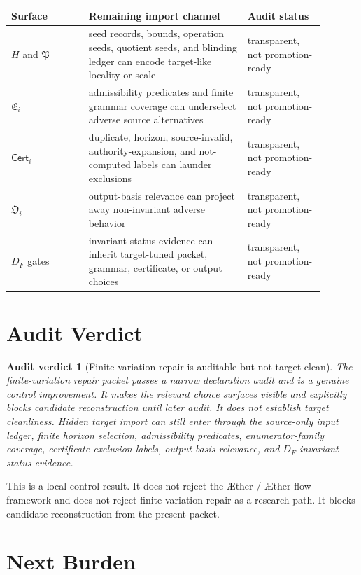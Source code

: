 \documentclass[11pt]{article}
\newcommand{\Aether}{\AE{}ther}
\newcommand{\Aflow}{\AE{}ther-flow}
\newcommand{\TheoryProgram}{\Aether{} / \Aflow{} framework}
\newcommand{\PackFam}{\mathfrak{P}}
\newcommand{\EnumFam}{\mathfrak{E}}
\newcommand{\Cert}{\mathsf{Cert}}
\newcommand{\OutFam}{\mathfrak{O}}
\newtheorem{auditverdict}{Audit verdict}
\begin{document}
\begin{center}
\begin{tabular}{p{0.22\linewidth}p{0.45\linewidth}p{0.22\linewidth}}
\textbf{Surface} & \textbf{Remaining import channel} & \textbf{Audit status} \\
\hline
\(H\) and \(\PackFam\) & seed records, bounds, operation seeds, quotient seeds, and blinding ledger can encode target-like locality or scale & transparent, not promotion-ready \\
\(\EnumFam_i\) & admissibility predicates and finite grammar coverage can underselect adverse source alternatives & transparent, not promotion-ready \\
\(\Cert_i\) & duplicate, horizon, source-invalid, authority-expansion, and not-computed labels can launder exclusions & transparent, not promotion-ready \\
\(\OutFam_i\) & output-basis relevance can project away non-invariant adverse behavior & transparent, not promotion-ready \\
\(D_F\) gates & invariant-status evidence can inherit target-tuned packet, grammar, certificate, or output choices & transparent, not promotion-ready \\
\end{tabular}
\end{center}

\section{Audit Verdict}

\begin{auditverdict}[Finite-variation repair is auditable but not target-clean]
The finite-variation repair packet passes a narrow declaration audit and is
a genuine control improvement. It makes the relevant choice surfaces visible
and explicitly blocks candidate reconstruction until later audit. It does
not establish target cleanliness. Hidden target import can still enter
through the source-only input ledger, finite horizon selection, admissibility
predicates, enumerator-family coverage, certificate-exclusion labels,
output-basis relevance, and \(D_F\) invariant-status evidence.
\end{auditverdict}

This is a local control result. It does not reject the \TheoryProgram{} and
does not reject finite-variation repair as a research path. It blocks
candidate reconstruction from the present packet.

\section{Next Burden}
\end{document}
